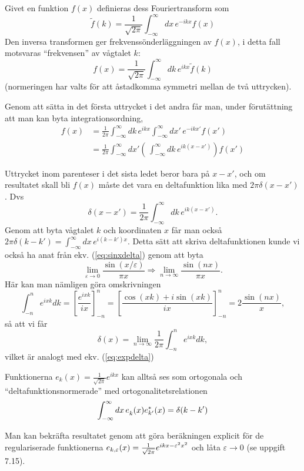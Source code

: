 \documentclass[%
oneside,                 %
final,                   %
10pt]{article}
\newenvironment{notice_mdfboxadmon}[1][]{
\begin{notice_mdfboxmdframed}[frametitle=#1]
}
{
\end{notice_mdfboxmdframed}
}
\begin{document}
\begin{notice_mdfboxadmon}

Givet en funktion $f(x)$ definieras dess Fouriertransform som
$$
\tilde f(k)=\frac{1}{\sqrt{2\pi}}\int_{-\infty}^\infty dx\,e^{-ikx}f(x)
$$
Den inversa transformen ger frekvenssönderläggningen av $f(x)$, i detta fall motsvaras ``frekvensen'' av vågtalet $k$:
$$
f(x)=\frac{1}{\sqrt{2\pi}}\int_{-\infty}^\infty dk\,e^{ikx}\tilde f(k)
$$
(normeringen har valts för att åstadkomma symmetri mellan de två uttrycken).

Genom att sätta in det första uttrycket i det andra får man, under förutättning att man kan byta integrationsordning,
\begin{align*}
f(x)&=\frac{1}{2\pi}\int_{-\infty}^\infty dk\,e^{ikx}
\int_{-\infty}^\infty dx'\,e^{-ikx'}f(x') \\ 
&=
\frac{1}{2\pi}\int_{-\infty}^\infty dx'
\left(\,\int_{-\infty}^\infty dk\,e^{ik(x-x')}\right)f(x')
\end{align*}

Uttrycket inom parenteser i det sista ledet beror bara på $x-x'$, och om resultatet skall bli $f(x)$ måste det vara en deltafunktion lika med $2\pi\delta(x-x')$. Dvs
\begin{equation}
\delta(x-x') = \frac{1}{2\pi} \int_{-\infty}^\infty dk\,e^{ik(x-x')}.
\label{eq:expdelta}
\end{equation}
Genom att byta vågtalet $k$ och koordinaten $x$ får man också $2\pi \delta(k-k') = \int_{-\infty}^\infty dx\,e^{i(k-k')x}$. Detta sätt att skriva deltafunktionen kunde vi också ha anat från ekv. (\ref{eq:sinxdelta}) genom att byta 
$$
\lim_{\varepsilon \to 0} \frac{\sin(x/\varepsilon)}{\pi x} \Rightarrow \lim_{n \to \infty} \frac{\sin(n x)}{\pi x}.
$$
Här kan man nämligen göra omskrivningen
\begin{equation}
\int_{-n}^n e^{i x k} dk = \left[ \frac{e^{ixk}}{ix} \right]_{-n}^n 
= \left[ \frac{\cos(xk)+i\sin(xk)}{ix} \right]_{-n}^n 
= 2 \frac{\sin(nx)}{x},
\end{equation}
så att vi får
\begin{equation}
\delta(x) = \lim_{n \to \infty} \frac{1}{2\pi} \int_{-n}^n e^{i x k} dk,
\end{equation}
vilket är analogt med ekv. (\ref{eq:expdelta})

Funktionerna $e_k(x)=\frac{1}{\sqrt{2\pi}}e^{ikx}$ kan alltså ses som ortogonala och ``deltafunktionsnormerade'' med ortogonalitetsrelationen
$$
\int_{-\infty}^\infty dx\,e^{\mathstrut}_k(x)e^*_{k'}(x)=\delta(k-k')
$$

Man kan bekräfta resultatet genom att göra beräkningen explicit 
för de regulariserade funktionerna $e_{k,\varepsilon}(x)={1\over\sqrt{2\pi}}e^{ikx-\varepsilon^2x^2}$ och låta $\varepsilon\rightarrow0$ (se uppgift 7.15).
\end{notice_mdfboxadmon} %




\end{document}
